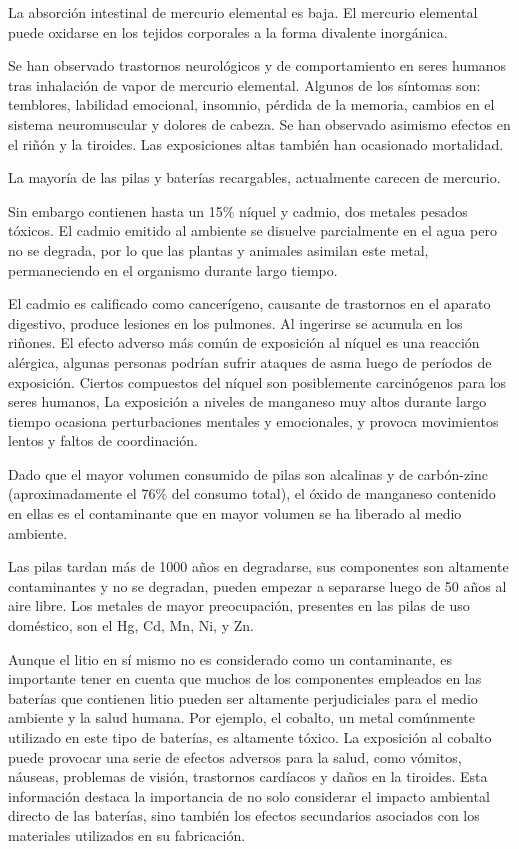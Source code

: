                 La absorción intestinal de mercurio elemental es baja. El mercurio elemental puede oxidarse en los tejidos corporales a la forma divalente inorgánica.\par
                Se han observado trastornos neurológicos y de comportamiento en seres humanos tras inhalación de vapor de mercurio elemental. Algunos de los síntomas son: temblores, labilidad emocional, insomnio, pérdida de la memoria, cambios en el sistema neuromuscular y dolores de cabeza. Se han observado asimismo efectos en el riñón y la tiroides. Las exposiciones altas también han ocasionado mortalidad.\par
                La mayoría de las pilas y baterías recargables, actualmente carecen de mercurio.\par
                Sin embargo contienen hasta un 15\% níquel y cadmio, dos metales pesados tóxicos. El cadmio emitido al ambiente se disuelve parcialmente en el agua pero no se degrada, por lo que las plantas y animales asimilan este metal, permaneciendo en el organismo durante largo tiempo.\par
                El cadmio es calificado como cancerígeno, causante de trastornos en el aparato digestivo, produce lesiones en los pulmones. Al ingerirse se acumula en los riñones. El efecto adverso más común de exposición al níquel es una reacción alérgica, algunas personas podrían sufrir ataques de asma luego de períodos de exposición. Ciertos compuestos del níquel son posiblemente carcinógenos para los seres humanos, La exposición a niveles de manganeso muy altos durante largo tiempo ocasiona perturbaciones mentales y emocionales, y provoca movimientos lentos y faltos de coordinación.\par
                Dado que el mayor volumen consumido de pilas son alcalinas y de carbón-zinc (aproximadamente el 76\% del consumo total), el óxido de manganeso contenido en ellas es el contaminante que en mayor volumen se ha liberado al medio ambiente.\par
                Las pilas tardan más de 1000 años en degradarse, sus componentes son altamente contaminantes y no se degradan, pueden empezar a separarse luego de 50 años al aire libre. Los metales de mayor preocupación, presentes en las pilas de uso doméstico, son el Hg, Cd, Mn, Ni, y Zn.\par 
                Aunque el litio en sí mismo no es considerado como un contaminante, es importante tener en cuenta que muchos de los componentes empleados en las baterías que contienen litio pueden ser altamente perjudiciales para el medio ambiente y la salud humana. Por ejemplo, el cobalto, un metal comúnmente utilizado en este tipo de baterías, es altamente tóxico. La exposición al cobalto puede provocar una serie de efectos adversos para la salud, como vómitos, náuseas, problemas de visión, trastornos cardíacos y daños en la tiroides. Esta información destaca la importancia de no solo considerar el impacto ambiental directo de las baterías, sino también los efectos secundarios asociados con los materiales utilizados en su fabricación.\par
                            
